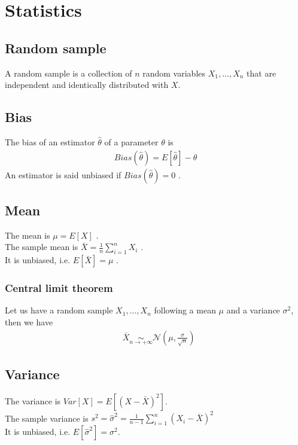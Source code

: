 \documentclass[../main.tex]{subfiles}
\begin{document}
\chapter{Statistics}
\section{Random sample}
A random sample is a collection of $n$ random variables $X_1,\dots, X_n$ that are independent and
identically distributed with $X$.

\section{Bias}
The bias of an estimator $\hat{\theta}$ of a parameter $\theta$ is
\begin{align*}
    Bias(\hat{\theta}) = E[\hat{\theta}] - \theta
\end{align*}
An estimator is said unbiased if $Bias(\hat{\theta}) = 0$ .

\section{Mean}
The mean is $\mu = E[X]$ . \\
The sample mean is $\bar{X} = \frac{1}{n} \sum_{i=1}^{n}{X_i}$ . \\
It is unbiased, i.e. $E[\bar{X}] = \mu$ .
\subsection{Central limit theorem}
Let us have a random sample $X_1,\dots, X_n$ following a mean $\mu$ and a variance $\sigma^2$, then we have
\begin{align*}
    &\bar{X} \underset{n \to +\infty}{\sim} \mathcal{N}(\mu, \frac{\sigma}{\sqrt{n}})
\end{align*}

\section{Variance}
The variance is $Var[X] = E[(X - \bar{X})^2]$. \\
The sample variance is $s^2 = \hat{\sigma}^2 = \frac{1}{n-1} \sum_{i=1}^{n}{(X_i - \bar{X})^2}$ \\
It is unbiased, i.e. $E[\hat{\sigma}^2] = \sigma^2$.
\end{document}
